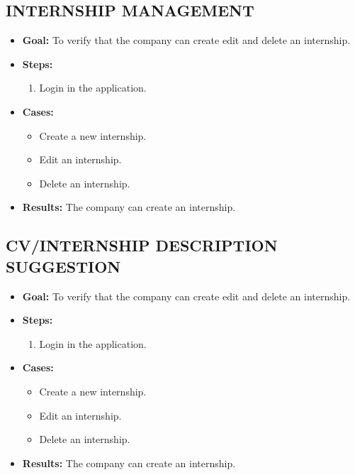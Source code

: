 \subsection{INTERNSHIP MANAGEMENT}\label{subsec:internship-management}
\begin{itemize}
    \item \textbf{Goal:} To verify that the company can create edit and delete an internship.

    \item \textbf{Steps:}
    \begin{enumerate}
        \item Login in the application.

    \end{enumerate}
    \item \textbf{Cases:}
    \begin{itemize}
        \item Create a new internship.
        \item Edit an internship.
        \item Delete an internship.
    \end{itemize}
    \item \textbf{Results:} The company can create an internship.

\end{itemize}

\subsection{CV/INTERNSHIP DESCRIPTION SUGGESTION}\label{subsec:cv-internship-description-suggestion}
\begin{itemize}
    \item \textbf{Goal:} To verify that the company can create edit and delete an internship.

    \item \textbf{Steps:}
    \begin{enumerate}
        \item Login in the application.

    \end{enumerate}
    \item \textbf{Cases:}
    \begin{itemize}
        \item Create a new internship.
        \item Edit an internship.
        \item Delete an internship.
    \end{itemize}
    \item \textbf{Results:} The company can create an internship.

\end{itemize}


